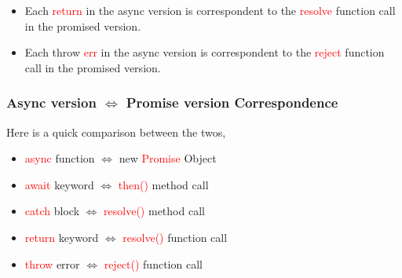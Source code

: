 \documentclass[a4paper]{article}
\begin{document}
\begin{remark}
\end{remark}
\begin{itemize}
\item Each \textcolor{red}{return} in the async version is correspondent to the \textcolor{red}{resolve} function call in the promised version.
\item Each throw \textcolor{red}{err} in the async version is correspondent to the \textcolor{red}{reject} function call in the promised version.
\end{itemize}

\subsubsection{Async version $\iff$ Promise version Correspondence}
Here is a quick comparison between the twos,
\begin{itemize}
\item \textcolor{red}{async} function $\iff$ new \textcolor{red}{Promise} Object
\item \textcolor{red}{await} keyword $\iff$ \textcolor{red}{then()} method call
\item \textcolor{red}{catch} block $\iff$ \textcolor{red}{resolve()} method call
\item \textcolor{red}{return} keyword $\iff$ \textcolor{red}{resolve()} function call
\item \textcolor{red}{throw} error $\iff$ \textcolor{red}{reject()} function call
\end{itemize}
\end{document}
